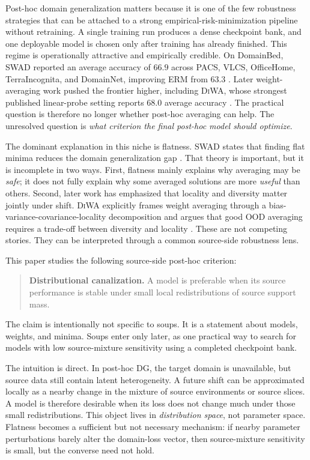 \documentclass{article}
\theoremstyle{definition}
\newcommand{\swad}{\textup{\textsc{SWAD}}}
\newcommand{\diwa}{\textup{\textsc{DiWA}}}
\newcommand{\erm}{\textup{\textsc{ERM}}}
\newcommand{\ood}{\textup{\textsc{OOD}}}
\begin{document}
Post-hoc domain generalization matters because it is one of the few robustness strategies that can be attached to a strong empirical-risk-minimization pipeline without retraining. A single training run produces a dense checkpoint bank, and one deployable model is chosen only after training has already finished. This regime is operationally attractive and empirically credible. On DomainBed, \swad{} reported an average accuracy of \(66.9\) across PACS, VLCS, OfficeHome, TerraIncognita, and DomainNet, improving \erm{} from \(63.3\) \citep{cha2021swad}. Later weight-averaging work pushed the frontier higher, including \diwa{}, whose strongest published linear-probe setting reports \(68.0\) average accuracy \citep{rame2022diwa}. The practical question is therefore no longer whether post-hoc averaging can help. The unresolved question is \emph{what criterion the final post-hoc model should optimize}.

The dominant explanation in this niche is flatness. \swad{} states that finding flat minima reduces the domain generalization gap \citep{cha2021swad}. That theory is important, but it is incomplete in two ways. First, flatness mainly explains why averaging may be \emph{safe}; it does not fully explain why some averaged solutions are more \emph{useful} than others. Second, later work has emphasized that locality and diversity matter jointly under shift. \diwa{} explicitly frames weight averaging through a bias-variance-covariance-locality decomposition and argues that good \ood{} averaging requires a trade-off between diversity and locality \citep{rame2022diwa}. These are not competing stories. They can be interpreted through a common source-side robustness lens.

This paper studies the following source-side post-hoc criterion:
\begin{quote}
\textbf{Distributional canalization.} A model is preferable when its source performance is stable under small local redistributions of source support mass.
\end{quote}

The claim is intentionally not specific to soups. It is a statement about models, weights, and minima. Soups enter only later, as one practical way to search for models with low source-mixture sensitivity using a completed checkpoint bank.

The intuition is direct. In post-hoc DG, the target domain is unavailable, but source data still contain latent heterogeneity. A future shift can be approximated locally as a nearby change in the mixture of source environments or source slices. A model is therefore desirable when its loss does not change much under those small redistributions. This object lives in \emph{distribution space}, not parameter space. Flatness becomes a sufficient but not necessary mechanism: if nearby parameter perturbations barely alter the domain-loss vector, then source-mixture sensitivity is small, but the converse need not hold.
\end{document}
